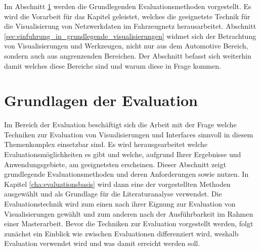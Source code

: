 \documentclass[draft=false
              ,paper=a4
              ,twoside=false
              ,fontsize=11pt
              ,headsepline
              ,BCOR10mm
              ,DIV11
              ]{scrbook}
\begin{document}
Im Abschnitt \ref{sec:grundlagen_der_evaluation} werden die Grundlegenden Evaluationsmethoden vorgestellt. Es wird die Vorarbeit für das Kapitel  geleistet, welches die geeignetste Technik für die Visualisierung von Netzwerkdaten im Fahrzeugnetz herausarbeitet. Abschnitt \ref{sec:einfuhrung_in_grundlegende_visualisierungen} widmet sich der Betrachtung von Visualisierungen und Werkzeugen, nicht nur aus dem Automotive Bereich, sondern auch aus angrenzenden Bereichen. Der Abschnitt befasst sich weiterhin damit welches diese Bereiche sind und warum diese in Frage kommen. 
%

\section{Grundlagen der Evaluation} %
\label{sec:grundlagen_der_evaluation}
Im Bereich der Evaluation beschäftigt sich die Arbeit mit der Frage welche Techniken zur Evaluation von Visualisierungen und Interfaces sinnvoll in diesem Themenkomplex einsetzbar sind. Es wird herausgearbeitet welche Evaluationsmöglichkeiten es gibt und welche, aufgrund Ihrer Ergebnisse und Anwendungsgebiete, am geeignetsten erscheinen. Dieser Abschnitt zeigt grundlegende Evaluationsmethoden und deren Anforderungen sowie nutzen. In Kapitel \ref{cha:evaluationsbasis} wird dann eine der vorgestellten Methoden ausgewählt und als Grundlage für die Literaturanalyse verwendet. Die Evaluationstechnik wird zum einen nach ihrer Eignung zur Evaluation von Visualisierungen gewählt und zum anderen nach der Ausführbarkeit im Rahmen einer Masterarbeit.
Bevor die Techniken zur Evaluation vorgestellt werden, folgt zunächst ein Einblick wie zwischen Evaluationen differenziert wird, weshalb Evaluation verwendet wird und was damit erreicht werden soll.
\end{document}
